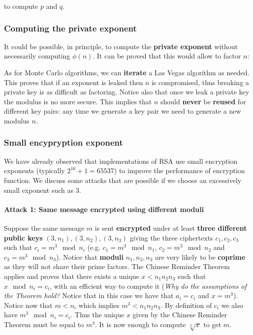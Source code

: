 to compute $p$ and $q$.

\subsubsection{Computing the private exponent}
It could be possible, in principle, to compute the \textbf{private exponent} without necessarily computing $\phi(n)$. It can be proved that this would allow to factor $n$:


As for Monte Carlo algorithms, we can \textbf{iterate} a Las Vegas algorithm as needed. This proves that if an exponent is leaked then $n$ is compromised, thus breaking a private key is as difficult as factoring. Notice also that once we leak a private key the modulus is no more secure. This implies that $n$ should \textbf{never} be \textbf{reused} for different key pairs: any time we generate a key pair we need to generate a new modulus $n$.

\subsubsection{Small encypryption exponent}
We have already observed that implementations of RSA use small encryption exponents (typically $2^{16}+1 = 65537$) to improve the performance of encryption function. We discuss some attacks that are possible if we choose an excessively small exponent such as 3.


\paragraph{Attack 1: Same message encrypted using different moduli}
Suppose the same message $m$ is sent \textbf{encrypted} under at least \textbf{three different public keys} $(3,n_1), (3,n_2), (3,n_3)$ giving the three ciphertexts $c_1,c_2,c_3$ such that $c_i = m^3 \mod n_i$ (e.g. $c_1 = m^3 \mod n_1$, $c_2 = m^3 \mod n_2$ and $c_3 = m^3 \mod n_3$). Notice that \textbf{moduli} $n_1,n_2,n_3$ are very likely to be \textbf{coprime} as they will not share their prime factors. The Chinese Reminder Theorem applies and proves that there exists a unique $x < n_1n_2n_3$ such that $x \mod n_i = c_i$, with an efficient way to compute it (\textit{Why do the assumptions of the Theorem hold?} Notice that in this case we have that $a_i = c_i$ and $x = m^3$). Notice now that $m < n_i$ which implies $m^3 < n_1n_2n_3$. By definition of $c_i$ we also have $m^3 \mod n_i = c_i$. Thus the unique $x$ given by the Chinese Reminder Theorem must be equal to $m^3$. It is now enough to compute $\sqrt[3]{x}$ to get $m$.

